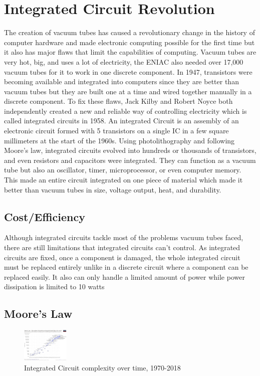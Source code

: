 \documentclass[letterpaper, 10 pt, conference]{IEEEconf}
\begin{document}

\section{Integrated Circuit Revolution}

The creation of vacuum tubes has caused a revolutionary change in the history of computer hardware and made electronic computing possible for the first time but it also has major flaws that limit the capabilities of computing. Vacuum tubes are very hot, big, and uses a lot of electricity, the ENIAC also needed over 17,000 vacuum tubes for it to work in one discrete component. In 1947, transistors were becoming available and integrated into computers since they are better than vacuum tubes but they are built one at a time and wired together manually in a discrete component. To fix these flaws, Jack Kilby and Robert Noyce both independently created a new and reliable way of controlling electricity which is called integrated circuits in 1958. An integrated Circuit is an assembly of an electronic circuit formed with 5 transistors on a single IC in a few square millimeters at the start of the 1960s. Using photolithography and following Moore’s law, integrated circuits evolved into hundreds or thousands of transistors, and even resistors and capacitors were integrated. They can function as a vacuum tube but also an oscillator, timer, microprocessor, or even computer memory. This made an entire circuit integrated on one piece of material which made it better than vacuum tubes in size, voltage output, heat, and durability.

\subsection{Cost/Efficiency}
Although integrated circuits tackle most of the problems vacuum tubes faced, there are still limitations that integrated circuits can’t control. As integrated circuits are fixed, once a component is damaged, the whole integrated circuit must be replaced entirely unlike in a discrete circuit where a component can be replaced easily. It also can only handle a limited amount of power while power dissipation is limited to 10 watts 

\subsection{Moore's Law}

\begin{figure}[h!]
\centering
\captionsetup{justification=centering}
\includegraphics[width=0.2\textwidth]{1024px-Moore's_Law_Transistor_Count_1971-2018.png}
\caption{Integrated Circuit complexity over time, 1970-2018}
\label{fig:example}
\end{figure} 
\end{document}
